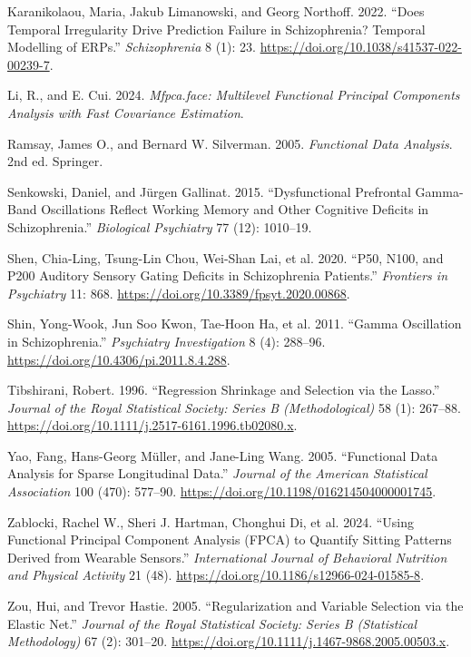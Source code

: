 \documentclass{article}
\newlength{\cslhangindent}
\newenvironment{CSLReferences}[2] %
 {\begin{list}{}{%
  \setlength{\itemindent}{0pt}
  \setlength{\leftmargin}{0pt}
  \setlength{\parsep}{0pt}
  \ifodd #1
   \setlength{\leftmargin}{\cslhangindent}
   \setlength{\itemindent}{-1\cslhangindent}
  \fi
  \setlength{\itemsep}{#2\baselineskip}}}
 {\end{list}}
\begin{document}
\begin{CSLReferences}{1}{1}
Karanikolaou, Maria, Jakub Limanowski, and Georg Northoff. 2022. {``Does
Temporal Irregularity Drive Prediction Failure in Schizophrenia?
Temporal Modelling of ERPs.''} \emph{Schizophrenia} 8 (1): 23.
\url{https://doi.org/10.1038/s41537-022-00239-7}.

Li, R., and E. Cui. 2024. \emph{Mfpca.face: Multilevel Functional
Principal Components Analysis with Fast Covariance Estimation}.

Ramsay, James O., and Bernard W. Silverman. 2005. \emph{Functional Data
Analysis}. 2nd ed. Springer.

Senkowski, Daniel, and Jürgen Gallinat. 2015. {``Dysfunctional
Prefrontal Gamma-Band Oscillations Reflect Working Memory and Other
Cognitive Deficits in Schizophrenia.''} \emph{Biological Psychiatry} 77
(12): 1010--19.

Shen, Chia-Ling, Tsung-Lin Chou, Wei-Shan Lai, et al. 2020. {``P50,
N100, and P200 Auditory Sensory Gating Deficits in Schizophrenia
Patients.''} \emph{Frontiers in Psychiatry} 11: 868.
\url{https://doi.org/10.3389/fpsyt.2020.00868}.

Shin, Yong-Wook, Jun Soo Kwon, Tae-Hoon Ha, et al. 2011. {``Gamma
Oscillation in Schizophrenia.''} \emph{Psychiatry Investigation} 8 (4):
288--96. \url{https://doi.org/10.4306/pi.2011.8.4.288}.

Tibshirani, Robert. 1996. {``Regression Shrinkage and Selection via the
Lasso.''} \emph{Journal of the Royal Statistical Society: Series B
(Methodological)} 58 (1): 267--88.
\url{https://doi.org/10.1111/j.2517-6161.1996.tb02080.x}.

Yao, Fang, Hans-Georg Müller, and Jane-Ling Wang. 2005. {``Functional
Data Analysis for Sparse Longitudinal Data.''} \emph{Journal of the
American Statistical Association} 100 (470): 577--90.
\url{https://doi.org/10.1198/016214504000001745}.

{Zablocki, Rachel W., Sheri J. Hartman, Chonghui Di, et al.} 2024.
{``Using Functional Principal Component Analysis (FPCA) to Quantify
Sitting Patterns Derived from Wearable Sensors.''} \emph{International
Journal of Behavioral Nutrition and Physical Activity} 21 (48).
\url{https://doi.org/10.1186/s12966-024-01585-8}.

Zou, Hui, and Trevor Hastie. 2005. {``Regularization and Variable
Selection via the Elastic Net.''} \emph{Journal of the Royal Statistical
Society: Series B (Statistical Methodology)} 67 (2): 301--20.
\url{https://doi.org/10.1111/j.1467-9868.2005.00503.x}.

\end{CSLReferences}



\end{document}
